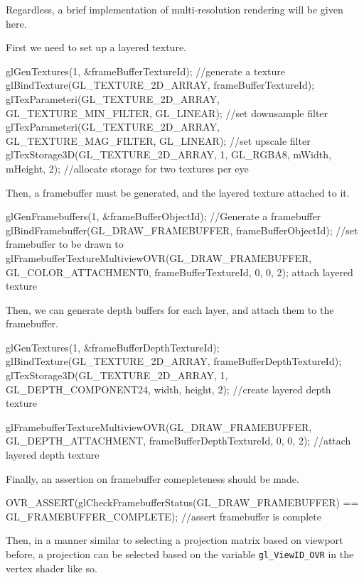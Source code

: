 \documentclass[12pt,a4paper,twoside,openright]{report}
\begin{document}
Regardless, a brief implementation of multi-resolution rendering will be given here.

First we need to set up a layered texture.

\begin{blockcode}
glGenTextures(1, &frameBufferTextureId); //generate a texture
glBindTexture(GL_TEXTURE_2D_ARRAY, frameBufferTextureId);
glTexParameteri(GL_TEXTURE_2D_ARRAY, GL_TEXTURE_MIN_FILTER, GL_LINEAR); //set downsample filter
glTexParameteri(GL_TEXTURE_2D_ARRAY, GL_TEXTURE_MAG_FILTER, GL_LINEAR); //set upscale filter
glTexStorage3D(GL_TEXTURE_2D_ARRAY, 1, GL_RGBA8, mWidth, mHeight, 2); //allocate storage for two textures per eye
\end{blockcode}

Then, a framebuffer must be generated, and the layered texture attached to it.

\begin{blockcode}
glGenFramebuffers(1, &frameBufferObjectId); //Generate a framebuffer
glBindFramebuffer(GL_DRAW_FRAMEBUFFER, frameBufferObjectId); //set framebuffer to be drawn to
glFramebufferTextureMultiviewOVR(GL_DRAW_FRAMEBUFFER, GL_COLOR_ATTACHMENT0, frameBufferTextureId, 0, 0, 2); attach layered texture
\end{blockcode}

Then, we can generate depth buffers for each layer, and attach them to the framebuffer.

\begin{blockcode}
glGenTextures(1, &frameBufferDepthTextureId);
glBindTexture(GL_TEXTURE_2D_ARRAY, frameBufferDepthTextureId);
glTexStorage3D(GL_TEXTURE_2D_ARRAY, 1, GL_DEPTH_COMPONENT24, width, height, 2); //create layered depth texture

glFramebufferTextureMultiviewOVR(GL_DRAW_FRAMEBUFFER, GL_DEPTH_ATTACHMENT, frameBufferDepthTextureId, 0, 0, 2); //attach layered depth texture
\end{blockcode}

Finally, an assertion on framebuffer comepleteness should be made.
\begin{blockcode}
OVR_ASSERT(glCheckFramebufferStatus(GL_DRAW_FRAMEBUFFER) == GL_FRAMEBUFFER_COMPLETE); //assert framebuffer is complete
\end{blockcode}


Then, in a manner similar to selecting a projection matrix based on viewport before, a projection can be selected based on the variable \texttt{gl\_ViewID\_OVR} in the vertex shader like so.
\end{document}
